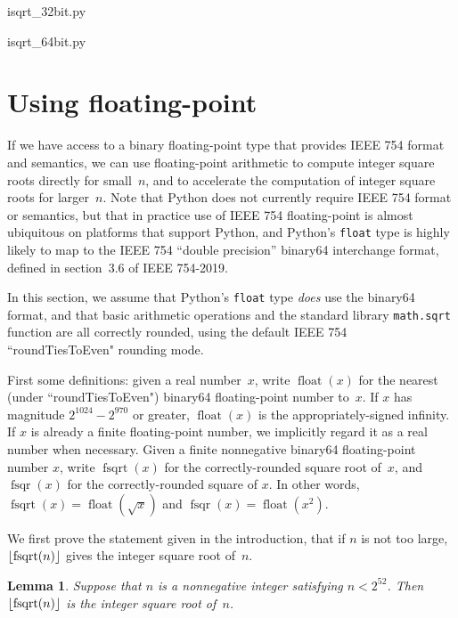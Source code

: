 \documentclass[a4paper]{article}
\DeclarePairedDelimiter\floor{\lfloor}{\rfloor}
\DeclareMathOperator{\fsqrt}{fsqrt}
\DeclareMathOperator{\fsqr}{fsqr}
\DeclareMathOperator{\float}{float}
\theoremstyle{plain}
\newtheorem{lemma}[theorem]{Lemma}
\theoremstyle{definition}
\begin{document}

  {isqrt_32bit.py}


  {isqrt_64bit.py}


\section{Using floating-point}

If we have access to a binary floating-point type that provides IEEE 754 format
and semantics, we can use floating-point arithmetic to compute integer square
roots directly for small~$n$, and to accelerate the computation of integer
square roots for larger~$n$. Note that Python does not currently require IEEE
754 format or semantics, but that in practice use of IEEE 754 floating-point is
almost ubiquitous on platforms that support Python, and Python's
\lstinline{float} type is highly likely to map to the IEEE 754
``double precision'' binary64 interchange format, defined in section~3.6 of
IEEE 754-2019.

In this section, we assume that Python's \lstinline{float} type \emph{does} use
the binary64 format, and that basic arithmetic operations and the standard
library \lstinline{math.sqrt} function are all correctly rounded, using the
default IEEE 754 ``roundTiesToEven" rounding mode.

First some definitions: given a real number~$x$, write $\float(x)$ for the
nearest (under ``roundTiesToEven") binary64 floating-point number to~$x$. If
$x$ has magnitude $2^{1024} - 2^{970}$ or greater, $\float(x)$ is the
appropriately-signed infinity. If $x$ is already a finite floating-point
number, we implicitly regard it as a real number when necessary. Given a finite
nonnegative binary64 floating-point number $x$, write $\fsqrt(x)$ for the
correctly-rounded square root of~$x$, and $\fsqr(x)$ for the correctly-rounded
square of $x$. In other words, $\fsqrt(x) = \float(\sqrt x)$ and $\fsqr(x) =
\float(x^2)$.

We first prove the statement given in the introduction, that if $n$ is
not too large, $\floor{\fsqrt(n)}$ gives the integer square root of~$n$.

\begin{lemma}
  Suppose that $n$ is a nonnegative integer satisfying $n < 2^{52}$. Then
  $\floor{\fsqrt(n)}$ is the integer square root of~$n$.
\end{lemma}
\end{document}
